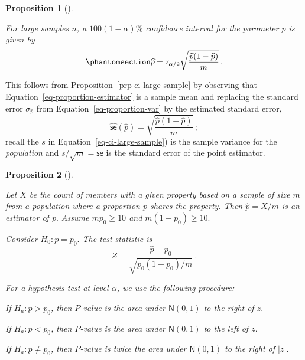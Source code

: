 \documentclass[
  a4paper,
  DIV=11,
  numbers=noendperiod,
  oneside]{scrreprt}
\theoremstyle{plain}
\theoremstyle{definition}
\theoremstyle{definition}
\theoremstyle{definition}
\theoremstyle{plain}
\newtheorem{proposition}{Proposition}[chapter]
\theoremstyle{remark}
\begin{document}
\begin{proposition}[]\protect\hypertarget{prp-ci-proportion}{}\label{prp-ci-proportion}

For large samples \(n\), a \(100(1-\alpha)\%\) confidence interval for
the parameter \(p\) is given by
\begin{equation}\phantomsection\label{eq-proportion-mean-ci}{
 \widehat{p} \pm z_{\alpha/2} \sqrt{\frac{\widehat{p} (1-\widehat{p})}{m}}\,.
}\end{equation}

\end{proposition}

This follows from Proposition~\ref{prp-ci-large-sample} by observing
that Equation~\ref{eq-proportion-estimator} is a sample mean and
replacing the standard error \(\sigma_{\widehat{p}}\) from
Equation~\ref{eq-proportion-var} by the estimated standard error, \[
 \widehat{\mathsf{se}}(\widehat{p}) = \sqrt{\frac{\widehat{p} (1-\widehat{p})}{m}}\,;
\] recall the \(s\) in Equation~\ref{eq-ci-large-sample}) is the sample
variance for the \emph{population} and \(s / \sqrt{m} = \mathsf{se}\) is
the standard error of the point estimator.

\begin{proposition}[]\protect\hypertarget{prp-htest-proportion}{}\label{prp-htest-proportion}

Let \(X\) be the count of members with a given property based on a
sample of size \(m\) from a population where a proportion \(p\) shares
the property. Then \(\widehat{p} = X / m\) is an estimator of \(p.\)
Assume \(m p_0 \geq 10\) and \(m (1-p_0) \geq 10.\)

Consider \(H_0 : p = p_0.\) The test statistic is \[
 Z = \frac{\widehat{p} - p_0}{\sqrt{p_0 (1-p_0) / m}} \,.
\]

For a hypothesis test at level \(\alpha\), we use the following
procedure:

If \(H_a : p > p_0\), then \(P\)-value is the area under
\(\mathsf{N}(0,1)\) to the right of \(z.\)

If \(H_a : p < p_0\), then \(P\)-value is the area under
\(\mathsf{N}(0,1)\) to the left of \(z.\)

If \(H_a : p \neq p_0\), then \(P\)-value is twice the area under
\(\mathsf{N}(0,1)\) to the right of \(|z|.\)

\end{proposition}
\end{document}

